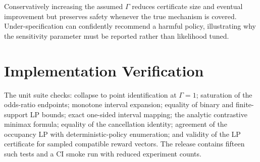 \documentclass[letterpaper]{article}
\begin{document}
Conservatively increasing the assumed $\Gamma$ reduces certificate size and eventual improvement but preserves safety whenever the true mechanism is covered. Under-specification can confidently recommend a harmful policy, illustrating why the sensitivity parameter must be reported rather than likelihood tuned.

\section{Implementation Verification}
The unit suite checks: collapse to point identification at $\Gamma=1$; saturation of the odds-ratio endpoints; monotone interval expansion; equality of binary and finite-support LP bounds; exact one-sided interval mapping; the analytic contrastive minimax formula; equality of the cancellation identity; agreement of the occupancy LP with deterministic-policy enumeration; and validity of the LP certificate for sampled compatible reward vectors. The release contains fifteen such tests and a CI smoke run with reduced experiment counts.

\nocite{clopper1934fiducial,weissman2003inequalities}
\ifAAAIFormat
\else
  
\fi

\end{document}
